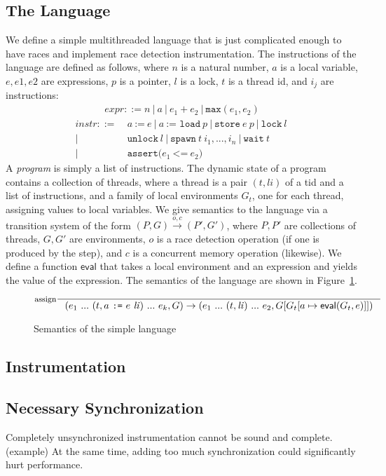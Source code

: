 \documentclass[preprint, 10pt]{sigplanconf}
\newcommand{\assign}[2]{#1\ \texttt{:=}\ #2}
\newcommand{\load}[2]{#1\ \texttt{:= load}\ #2}
\newcommand{\store}[2]{\texttt{store}\ #2\ #1}
\newcommand{\lock}[1]{\texttt{lock}\ #1}
\newcommand{\unlock}[1]{\texttt{unlock}\ #1}
\newcommand{\spawn}[2]{\texttt{spawn}\ #1\ #2}
\newcommand{\wait}[1]{\texttt{wait}\ #1}
\newcommand{\assert}[2]{\texttt{assert(}#1\ \texttt{<=}\ #2\texttt{)}}
\begin{document}
\subsection{The Language}
We define a simple multithreaded language that is just complicated enough to have races and implement race detection instrumentation. The instructions of the language are defined as follows, where $n$ is a natural number, $a$ is a local variable, $e, e1, e2$ are expressions, $p$ is a pointer, $l$ is a lock, $t$ is a thread id, and $i_j$ are instructions:
\begin{align*}\mathit{expr} ::= n~|~a~|~e_1 + e_2~|~\mathtt{max}(e_1, e_2)\end{align*}
\begin{align*}\mathit{instr} ::=\ &\assign{a}{e}~|~\load{a}{p}~|~\store{p}{e}~|~\lock{l}~\\|~&\unlock{l}~|~\spawn{t}{i_1, ..., i_n}~|~\wait{t}~\\|~&\assert{e_1}{e_2}\end{align*}
A \emph{program} is simply a list of instructions. The dynamic state of a program contains a collection of threads, where a thread is a pair $(t, \mathit{li})$ of a tid and a list of instructions, and a family of local environments $G_t$, one for each thread, assigning values to local variables. We give semantics to the language via a transition system of the form $(P, G) \xrightarrow{o, c} (P', G')$, where $P, P'$ are collections of threads, $G, G'$ are environments, $o$ is a race detection operation (if one is produced by the step), and $c$ is a concurrent memory operation (likewise). We define a function $\mathsf{eval}$ that takes a local environment and an expression and yields the value of the expression. The semantics of the language are shown in Figure~\ref{semantics}.

\begin{figure}[htb]
$$\inference[assign]{}{(e_1\ ...\ (t, \assign{a}{e}\ \mathit{li})\ ...\ e_k, G) \rightarrow (e_1\ ...\ (t, \mathit{li})\ ...\ e_2, G[G_t[a \mapsto \mathsf{eval}(G_t, e)]])}$$

\caption{Semantics of the simple language}
\label{semantics}
\end{figure}


\subsection{Instrumentation}

\subsection{Necessary Synchronization}
Completely unsynchronized instrumentation cannot be sound and complete. (example) At the same time, adding too much synchronization could significantly hurt performance.
\end{document}
